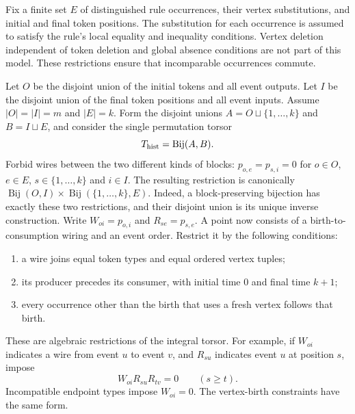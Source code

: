 \documentclass[11pt]{article}
\theoremstyle{definition}
\newcommand{\Bij}{\operatorname{Bij}}
\numberwithin{equation}{section}
\begin{document}
Fix a finite set $E$ of distinguished rule occurrences, their vertex
substitutions, and initial and final token positions. The substitution
for each occurrence is assumed to satisfy the rule's local equality
and inequality conditions. Vertex deletion independent of token
deletion and global absence conditions are not part of this model.
These restrictions ensure that incomparable occurrences commute.

Let $O$ be the disjoint union of the initial tokens and all event
outputs. Let $I$ be the disjoint union of the final token positions
and all event inputs. Assume $|O|=|I|=m$ and $|E|=k$.
Form the disjoint unions $A=O\sqcup\{1,\ldots,k\}$ and
$B=I\sqcup E$, and consider the single permutation torsor
\begin{equation}\label{eq:historytorsor}
 T_{\rm hist}=\Bij(A,B).
\end{equation}
Forbid wires between the two different kinds of blocks:
$p_{o,e}=p_{s,i}=0$ for $o\in O$, $e\in E$,
$s\in\{1,\ldots,k\}$ and $i\in I$.
The resulting restriction is canonically
$\Bij(O,I)\times\Bij(\{1,\ldots,k\},E)$.
Indeed, a block-preserving bijection has exactly these two restrictions,
and their disjoint union is its unique inverse construction.
Write $W_{oi}=p_{o,i}$ and $R_{se}=p_{s,e}$.
A point now consists of a birth-to-consumption wiring and an event order.
Restrict it by the following conditions:
\begin{enumerate}
\item a wire joins equal token types and equal ordered vertex tuples;
\item its producer precedes its consumer, with initial time $0$ and
      final time $k+1$;
\item every occurrence other than the birth that uses a fresh vertex
      follows that birth.
\end{enumerate}
These are algebraic restrictions of the integral torsor. For example,
if $W_{oi}$ indicates a wire from event $u$ to event $v$, and $R_{su}$
indicates event $u$ at position $s$, impose
\[
 W_{oi}R_{su}R_{tv}=0\qquad(s\ge t).
\]
Incompatible endpoint types impose $W_{oi}=0$.
The vertex-birth constraints have the same form.
\end{document}
